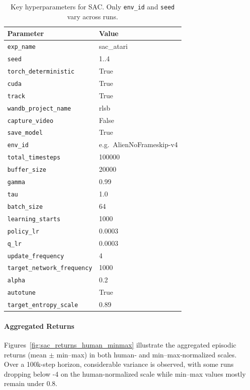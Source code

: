\begin{table}
	\caption{Key hyperparameters for SAC. Only \texttt{env\_id} and \texttt{seed} vary across runs.}
	\label{tab:sac_hyperparams}
	\centering
	\begin{tabular}{ll}
		\toprule
		\textbf{Parameter} & \textbf{Value} \\
		\midrule
		\texttt{exp\_name}              & sac\_atari \\
		\texttt{seed}                   & 1..4 \\
		\texttt{torch\_deterministic}   & True \\
		\texttt{cuda}                   & True \\
		\texttt{track}                  & True \\
		\texttt{wandb\_project\_name}   & rlsb \\
		\texttt{capture\_video}         & False \\
		\texttt{save\_model}            & True \\
		\texttt{env\_id}                & e.g.\ AlienNoFrameskip-v4 \\
		\texttt{total\_timesteps}       & 100000 \\
		\texttt{buffer\_size}           & 20000 \\
		\texttt{gamma}                  & 0.99 \\
		\texttt{tau}                    & 1.0 \\
		\texttt{batch\_size}            & 64 \\
		\texttt{learning\_starts}       & 1000 \\
		\texttt{policy\_lr}             & 0.0003 \\
		\texttt{q\_lr}                  & 0.0003 \\
		\texttt{update\_frequency}      & 4 \\
		\texttt{target\_network\_frequency} & 1000 \\
		\texttt{alpha}                  & 0.2 \\
		\texttt{autotune}               & True \\
		\texttt{target\_entropy\_scale} & 0.89 \\
		\bottomrule
	\end{tabular}
\end{table}

\paragraph{Aggregated Returns}
Figures~\ref{fig:sac_returns_human_minmax} illustrate the aggregated episodic returns (mean \(\pm\) min–max) in both human‐ and min–max‐normalized scales. Over a 100k-step horizon, considerable variance is observed, with some runs dropping below -4 on the human-normalized scale while min–max values mostly remain under 0.8.

